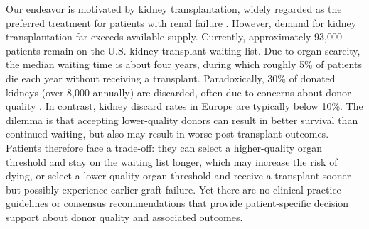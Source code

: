 \documentclass{article}
\theoremstyle{plain}
\theoremstyle{definition}
\theoremstyle{remark}
\begin{document}
Our endeavor is motivated by kidney transplantation,  widely regarded as the preferred treatment for patients with renal failure \citep{wolfe1999comparison}. However, demand for kidney transplantation far exceeds available supply. Currently, approximately 93,000 patients remain on the U.S. kidney transplant waiting list. Due to organ scarcity, the median waiting time is about four years, during which roughly 5\% of patients die each year without receiving a transplant. Paradoxically, 30\% of donated kidneys (over 8,000 annually) are discarded, often due to concerns about donor quality \citep{Marrero}. In contrast, kidney discard rates in Europe are typically below 10\%.  The dilemma is that accepting lower-quality donors can result in better survival than continued waiting, but also may result in worse post-transplant outcomes. Patients therefore face a trade-off: they can select a higher-quality organ threshold and stay on the waiting list longer, which may increase the risk of dying, or select a lower-quality organ threshold and receive a transplant sooner but possibly experience earlier graft failure. Yet there are no clinical practice guidelines or consensus recommendations that provide patient-specific decision support about donor quality and associated outcomes. %
\end{document}
